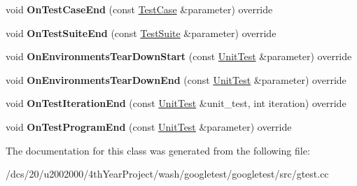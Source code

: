 \begin{DoxyCompactItemize}
\item 
\mbox{\label{classtesting_1_1internal_1_1TestEventRepeater_a93a1095b37efd7315a804a6c18c78c1c}} 
void {\bfseries On\+Test\+Case\+End} (const \mbox{\hyperlink{classtesting_1_1TestSuite}{Test\+Case}} \&parameter) override
\item 
\mbox{\label{classtesting_1_1internal_1_1TestEventRepeater_a59e442d1f79ea186499ef99284a60d4c}} 
void {\bfseries On\+Test\+Suite\+End} (const \mbox{\hyperlink{classtesting_1_1TestSuite}{Test\+Suite}} \&parameter) override
\item 
\mbox{\label{classtesting_1_1internal_1_1TestEventRepeater_a864fbaf2485807c333b9b95a39cf78cf}} 
void {\bfseries On\+Environments\+Tear\+Down\+Start} (const \mbox{\hyperlink{classtesting_1_1UnitTest}{Unit\+Test}} \&parameter) override
\item 
\mbox{\label{classtesting_1_1internal_1_1TestEventRepeater_a02007891c9e7efdfc8e17a49172f6792}} 
void {\bfseries On\+Environments\+Tear\+Down\+End} (const \mbox{\hyperlink{classtesting_1_1UnitTest}{Unit\+Test}} \&parameter) override
\item 
\mbox{\label{classtesting_1_1internal_1_1TestEventRepeater_aa4a52e544380946ff86fc57915aa7152}} 
void {\bfseries On\+Test\+Iteration\+End} (const \mbox{\hyperlink{classtesting_1_1UnitTest}{Unit\+Test}} \&unit\+\_\+test, int iteration) override
\item 
\mbox{\label{classtesting_1_1internal_1_1TestEventRepeater_a4d10b89935d31698b94015a0eff00ea3}} 
void {\bfseries On\+Test\+Program\+End} (const \mbox{\hyperlink{classtesting_1_1UnitTest}{Unit\+Test}} \&parameter) override
\end{DoxyCompactItemize}


The documentation for this class was generated from the following file\+:\begin{DoxyCompactItemize}
\item 
/dcs/20/u2002000/4th\+Year\+Project/wash/googletest/googletest/src/gtest.\+cc\end{DoxyCompactItemize}
